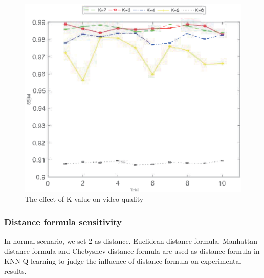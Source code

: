 \documentclass[twocolumn]{article}
\begin{document}
\begin{figure}[htbp]
\centering
\includegraphics[width=\columnwidth]{k_sensitivity_ssim}
\caption{The effect of K value on video quality}
\label{k_sensitivity_ssim}
\end{figure}
\subsubsection{Distance formula sensitivity}
In normal scenario, we set 2 as distance. 
Euclidean distance formula, Manhattan distance formula and Chebyshev distance formula 
are used as distance formula in KNN-Q learning to judge the influence 
of distance formula on experimental results.
\end{document}
